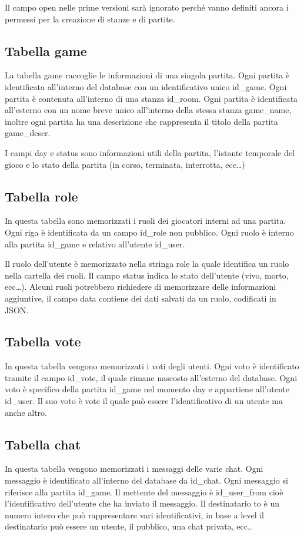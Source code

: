 \documentclass[10pt,a4paper]{article}
\begin{document}
Il campo \textsf{open} nelle prime versioni sarà ignorato perché vanno definiti ancora i permessi per la creazione di stanze e di partite.

\subsection{Tabella game}
La tabella game raccoglie le informazioni di una singola partita. Ogni partita è identificata all'interno del database con un identificativo unico \textsf{id\_game}. Ogni partita è contenuta all'interno di una stanza \textsf{id\_room}. Ogni partita è identificata all'esterno con un nome breve unico all'interno della stessa stanza \textsf{game\_name}, inoltre ogni partita ha una descrizione che rappresenta il titolo della partita \textsf{game\_descr}.

I campi \textsf{day} e \textsf{status} sono informazioni utili della partita, l'istante temporale del gioco e lo stato della partita (in corso, terminata, interrotta, ecc\dots)

\subsection{Tabella role}
In questa tabella sono memorizzati i ruoli dei giocatori interni ad una partita. Ogni riga è identificata da un campo \textsf{id\_role} non pubblico. Ogni ruolo è interno alla partita \textsf{id\_game} e relativo all'utente \textsf{id\_user}. 

Il ruolo dell'utente è memorizzato nella stringa \textsf{role} la quale identifica un ruolo nella cartella dei ruoli. Il campo \textsf{status} indica lo stato dell'utente (vivo, morto, ecc\dots). Alcuni ruoli potrebbero richiedere di memorizzare delle informazioni aggiuntive, il campo \textsf{data} contiene dei dati salvati da un ruolo, codificati in \textsf{JSON}.

\subsection{Tabella vote}
In questa tabella vengono memorizzati i voti degli utenti. Ogni voto è identificato tramite il campo \textsf{id\_vote}, il quale rimane nascosto all'esterno del database. Ogni voto è specifico della partita \textsf{id\_game} nel momento \textsf{day} e appartiene all'utente \textsf{id\_user}. Il suo voto è \textsf{vote} il quale può essere l'identificativo di un utente ma anche altro. 

\subsection{Tabella chat}
In questa tabella vengono memorizzati i messaggi delle varie chat. Ogni messaggio è identificato all'interno del database da \textsf{id\_chat}. Ogni messaggio si riferisce alla partita \textsf{id\_game}. Il mettente del messaggio è \textsf{id\_user\_from} cioè l'identificativo dell'utente che ha inviato il messaggio. Il destinatario \textsf{to} è un numero intero che può rappresentare vari identificativi, in base a \textsf{level} il destinatario può essere un utente, il pubblico, una chat privata, ecc..
\end{document}
